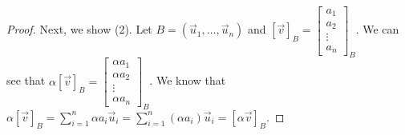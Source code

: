 \begin{proof}
    Next, we show (2). Let $B=(\vec{u}_1,\ldots,\vec{u}_n)$ and $[\vec{v}]_B=\left[\begin{smallmatrix}
        a_1 \\ a_2 \\ \vdots \\ a_n
    \end{smallmatrix}\right]_B$. We can see that $\alpha[\vec{v}]_B=\left[\begin{smallmatrix}
        \alpha a_1 \\ \alpha a_2 \\ \vdots \\ \alpha a_n
    \end{smallmatrix}\right]_B$. We know that $\alpha[\vec{v}]_B=\sum_{i=1}^n\alpha a_i\vec{u}_i=\sum_{i=1}^n (\alpha a_i)\vec{u}_i=[\alpha\vec{v}]_B$.
\end{proof}
